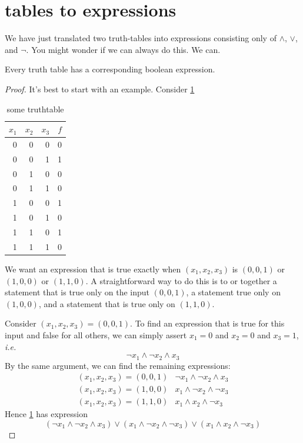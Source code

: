 \documentclass{scrbook}
\newcommand{\ie}{\emph{i.e.}\xspace}
\begin{document}
\section[Tables to Expressions]{tables to expressions}
We have just translated two truth-tables into expressions consisting only of $\wedge$, $\vee$, and $\neg$. You might wonder if we can always do this. We can. 
\begin{theorem}[completeness]
  Every truth table has a corresponding boolean expression.
\end{theorem}
\begin{proof}
  It's best to start with an example. Consider \cref{tt:complete}
  \begin{table}[h!]
    \centering
  \caption{some truthtable}\label{tt:complete}
\begin{tabular}{rrrr}
$x_1$ & $x_2$ & $x_3$ & $f$ \\
\hline
0 & 0 & 0 & 0 \\
\rowcolor{LightCyan} 0 & 0 & 1 & 1 \\
0 & 1 & 0 & 0 \\
0 & 1 & 1 & 0 \\
\rowcolor{LightCyan} 1 & 0 & 0 & 1 \\
1 & 0 & 1 & 0 \\
\rowcolor{LightCyan} 1 & 1 & 0 & 1 \\
1 & 1 & 1 & 0 
\end{tabular}
\end{table}
We want an expression that is true exactly when $(x_1,x_2,x_3)$ is $(0,0,1)$ or $(1,0,0)$ or $(1,1,0)$. A straightforward way to do this is to or together a statement that is true only on the input $(0,0,1)$, a statement true only on $(1,0,0)$, and a statement that is true only on $(1,1,0)$. 

Consider $(x_1,x_2,x_3)=(0,0,1)$. To find an expression that is true for this input and false for all others, we can simply assert $x_1=0$ and $x_2=0$ and $x_3=1$, \ie
\[
\neg x_1\wedge \neg x_2 \wedge x_3
\]
By the same argument, we can find the remaining expressions:
\[
\begin{matrix}
 (x_1,x_2,x_3)=(0,0,1) & \neg x_1 \wedge \neg x_2 \wedge x_3 \\
 (x_1,x_2,x_3)=(1,0,0) & x_1 \wedge \neg x_2 \wedge \neg x_3 \\
 (x_1,x_2,x_3)=(1,1,0) & x_1 \wedge x_2 \wedge \neg x_3 
\end{matrix}
\]
Hence \cref{tt:complete} has expression 
\[
(\neg x_1 \wedge \neg x_2 \wedge x_3 ) \vee (x_1 \wedge \neg x_2 \wedge \neg x_3) \vee  (x_1 \wedge x_2 \wedge \neg x_3)
\]


\end{proof}
\end{document}
